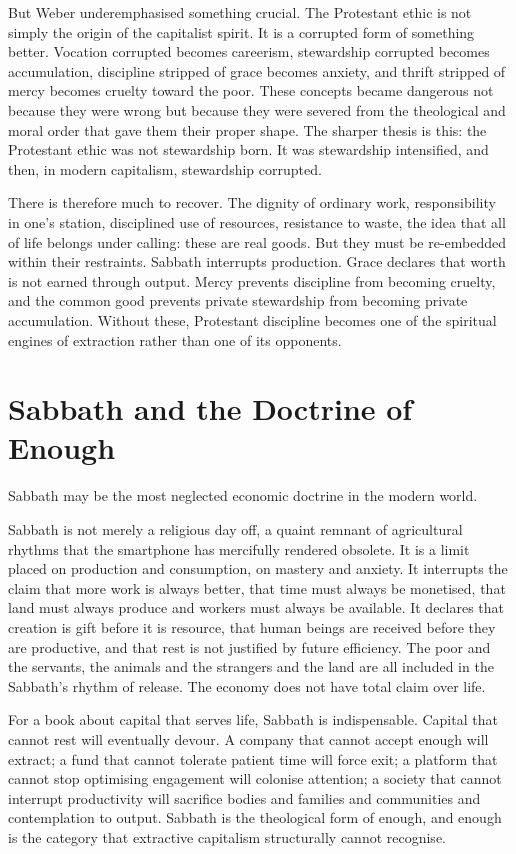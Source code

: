 \documentclass[11pt,a4paper,oneside]{book}
\begin{document}
But Weber underemphasised something crucial. The Protestant ethic is not simply the origin of the capitalist spirit. It is a corrupted form of something better. Vocation corrupted becomes careerism, stewardship corrupted becomes accumulation, discipline stripped of grace becomes anxiety, and thrift stripped of mercy becomes cruelty toward the poor. These concepts became dangerous not because they were wrong but because they were severed from the theological and moral order that gave them their proper shape. The sharper thesis is this: the Protestant ethic was not stewardship born. It was stewardship intensified, and then, in modern capitalism, stewardship corrupted.

There is therefore much to recover. The dignity of ordinary work, responsibility in one's station, disciplined use of resources, resistance to waste, the idea that all of life belongs under calling: these are real goods. But they must be re-embedded within their restraints. Sabbath interrupts production. Grace declares that worth is not earned through output. Mercy prevents discipline from becoming cruelty, and the common good prevents private stewardship from becoming private accumulation. Without these, Protestant discipline becomes one of the spiritual engines of extraction rather than one of its opponents.

\section*{Sabbath and the Doctrine of Enough}

Sabbath may be the most neglected economic doctrine in the modern world.

Sabbath is not merely a religious day off, a quaint remnant of agricultural rhythms that the smartphone has mercifully rendered obsolete. It is a limit placed on production and consumption, on mastery and anxiety. It interrupts the claim that more work is always better, that time must always be monetised, that land must always produce and workers must always be available. It declares that creation is gift before it is resource, that human beings are received before they are productive, and that rest is not justified by future efficiency. The poor and the servants, the animals and the strangers and the land are all included in the Sabbath's rhythm of release. The economy does not have total claim over life.

For a book about capital that serves life, Sabbath is indispensable. Capital that cannot rest will eventually devour. A company that cannot accept enough will extract; a fund that cannot tolerate patient time will force exit; a platform that cannot stop optimising engagement will colonise attention; a society that cannot interrupt productivity will sacrifice bodies and families and communities and contemplation to output. Sabbath is the theological form of enough, and enough is the category that extractive capitalism structurally cannot recognise.
\end{document}
